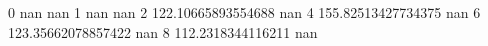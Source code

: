 0 nan nan
1 nan nan
2 122.10665893554688 nan
4 155.82513427734375 nan
6 123.35662078857422 nan
8 112.2318344116211 nan
